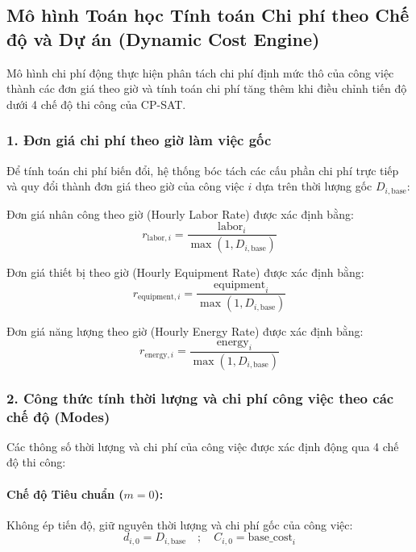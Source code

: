 \subsection{Mô hình Toán học Tính toán Chi phí theo Chế độ và Dự án (Dynamic Cost Engine)}
Mô hình chi phí động thực hiện phân tách chi phí định mức thô của công việc thành các đơn giá theo giờ và tính toán chi phí tăng thêm khi điều chỉnh tiến độ dưới 4 chế độ thi công của CP-SAT.

\subsubsection{1. Đơn giá chi phí theo giờ làm việc gốc}
Để tính toán chi phí biến đổi, hệ thống bóc tách các cấu phần chi phí trực tiếp và quy đổi thành đơn giá theo giờ của công việc $i$ dựa trên thời lượng gốc $D_{i, \text{base}}$:

Đơn giá nhân công theo giờ (Hourly Labor Rate) được xác định bằng:
\begin{equation}
    r_{\text{labor}, i} = \frac{\text{labor}_i}{\max(1, D_{i, \text{base}})}
\end{equation}

Đơn giá thiết bị theo giờ (Hourly Equipment Rate) được xác định bằng:
\begin{equation}
    r_{\text{equipment}, i} = \frac{\text{equipment}_i}{\max(1, D_{i, \text{base}})}
\end{equation}

Đơn giá năng lượng theo giờ (Hourly Energy Rate) được xác định bằng:
\begin{equation}
    r_{\text{energy}, i} = \frac{\text{energy}_i}{\max(1, D_{i, \text{base}})}
\end{equation}

\subsubsection{2. Công thức tính thời lượng và chi phí công việc theo các chế độ (Modes)}
Các thông số thời lượng và chi phí của công việc được xác định động qua 4 chế độ thi công:

\paragraph{Chế độ Tiêu chuẩn ($m=0$):}
Không ép tiến độ, giữ nguyên thời lượng và chi phí gốc của công việc:
\begin{equation}
    d_{i, 0} = D_{i, \text{base}} \quad ; \quad C_{i, 0} = \text{base\_cost}_i
\end{equation}

